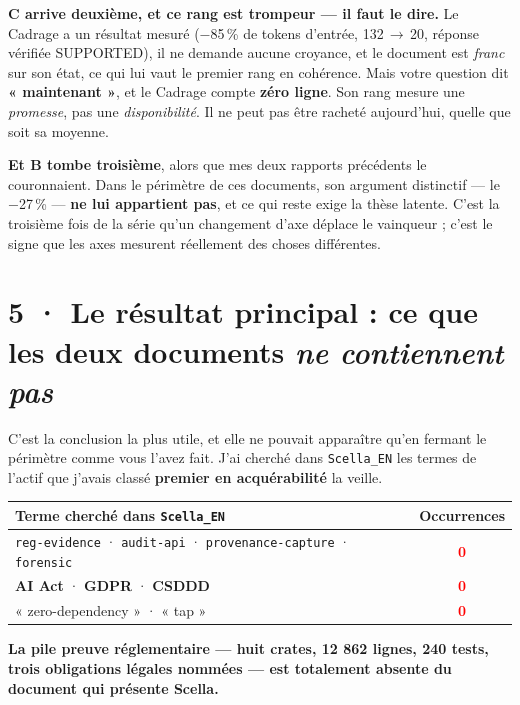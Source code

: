 \documentclass[10pt]{article}
\newcommand{\pire}[1]{\textcolor{red}{\textbf{#1}}}
\newcommand{\code}[1]{\texttt{\small #1}}
\newcommand{\pc}{\,\%}
\begin{document}
\begin{alerte}
\textbf{C arrive deuxième, et ce rang est trompeur --- il faut le dire.} Le Cadrage a un résultat
mesuré ($-$85\pc{} de tokens d'entrée, 132\,$\rightarrow$\,20, réponse vérifiée SUPPORTED), il ne demande
aucune croyance, et le document est \emph{franc} sur son état, ce qui lui vaut le premier rang en
cohérence. Mais votre question dit \textbf{« maintenant »}, et le Cadrage compte \textbf{zéro ligne}.
Son rang mesure une \emph{promesse}, pas une \emph{disponibilité}. Il ne peut pas être racheté
aujourd'hui, quelle que soit sa moyenne.
\end{alerte}

\textbf{Et B tombe troisième}, alors que mes deux rapports précédents le couronnaient. Dans le
périmètre de ces documents, son argument distinctif --- le $-$27\pc{} --- \textbf{ne lui appartient
pas}, et ce qui reste exige la thèse latente. C'est la troisième fois de la série qu'un changement
d'axe déplace le vainqueur ; c'est le signe que les axes mesurent réellement des choses différentes.

\section{5 · Le résultat principal : ce que les deux documents \emph{ne contiennent pas}}

C'est la conclusion la plus utile, et elle ne pouvait apparaître qu'en fermant le périmètre comme vous
l'avez fait. J'ai cherché dans \code{Scella\_EN} les termes de l'actif que j'avais classé
\textbf{premier en acquérabilité} la veille.

\renewcommand{\arraystretch}{1.15}
\begin{center}\small
\begin{tabular}{@{}>{\raggedright\arraybackslash}p{9.8cm} c@{}}
\toprule
\textbf{Terme cherché dans \code{Scella\_EN}} & \textbf{Occurrences} \\
\midrule
\code{reg-evidence} · \code{audit-api} · \code{provenance-capture} · \code{forensic} & \pire{0} \\
\textbf{AI Act} · \textbf{GDPR} · \textbf{CSDDD} & \pire{0} \\
« zero-dependency » · « tap » & \pire{0} \\
\bottomrule
\end{tabular}
\end{center}

\begin{acquis}
\textbf{La pile preuve réglementaire --- huit crates, 12 862 lignes, 240 tests, trois obligations
légales nommées --- est totalement absente du document qui présente Scella.}
\end{acquis}
\end{document}
